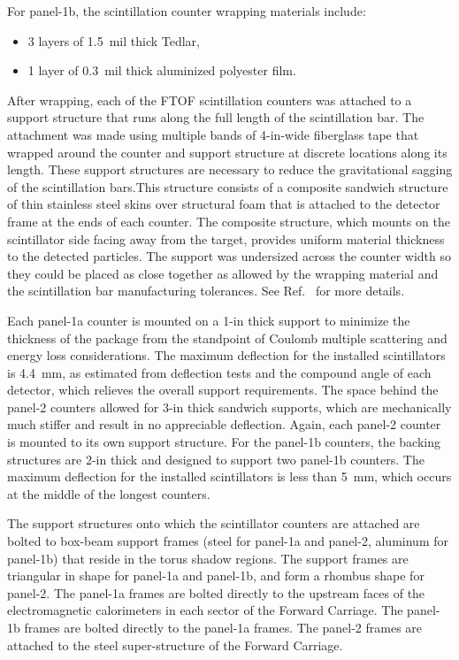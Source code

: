 \documentclass[3p,times,twocolumn]{elsarticle}
\begin{document}
\noindent
For panel-1b, the scintillation counter wrapping materials include:

\begin{itemize}
\item 3 layers of 1.5~mil thick Tedlar,
\item 1 layer of 0.3~mil thick aluminized polyester film.
\end{itemize}

After wrapping, each of the FTOF scintillation counters was attached to a support structure that runs
along the full length of the scintillation bar. The attachment was made using multiple bands of 4-in-wide
fiberglass tape that wrapped around the counter and support structure at discrete locations along its
length. These support structures are necessary to reduce the gravitational sagging of the scintillation
bars.This structure consists of a composite sandwich structure of thin stainless steel skins over structural
foam that is attached to the detector frame at the ends of each counter. The composite structure, which
mounts on the scintillator side facing away from the target, provides uniform material thickness to the
detected particles.  The support was undersized across the counter width so they could be placed as
close together as allowed by the wrapping material and the scintillation bar manufacturing tolerances.
See Ref.~\cite{tof-nim} for more details. 

Each panel-1a counter is mounted on a 1-in thick support to minimize the thickness of the package from
the standpoint of Coulomb multiple scattering and energy loss considerations.  The maximum deflection
for the installed scintillators is 4.4~mm, as estimated from deflection tests and the compound angle of
each detector, which relieves the overall support requirements. The space behind the panel-2 counters
allowed for 3-in thick sandwich supports, which are mechanically much stiffer and result in no appreciable
deflection. Again, each panel-2 counter is mounted to its own support structure. For the panel-1b counters,
the backing structures are 2-in thick and designed to support two panel-1b counters. The maximum
deflection for the installed scintillators is less than 5~mm, which occurs at the middle of the longest
counters.

The support structures onto which the scintillator counters are attached are bolted to box-beam support
frames (steel for panel-1a and panel-2, aluminum for panel-1b) that reside in the torus shadow regions.
The support frames are triangular in shape for panel-1a and panel-1b, and form a rhombus shape for
panel-2. The panel-1a frames are bolted directly to the upstream faces of the electromagnetic
calorimeters in each sector of the Forward Carriage. The panel-1b frames are bolted directly to the
panel-1a frames. The panel-2 frames are attached to the steel super-structure of the Forward Carriage.
\end{document}
